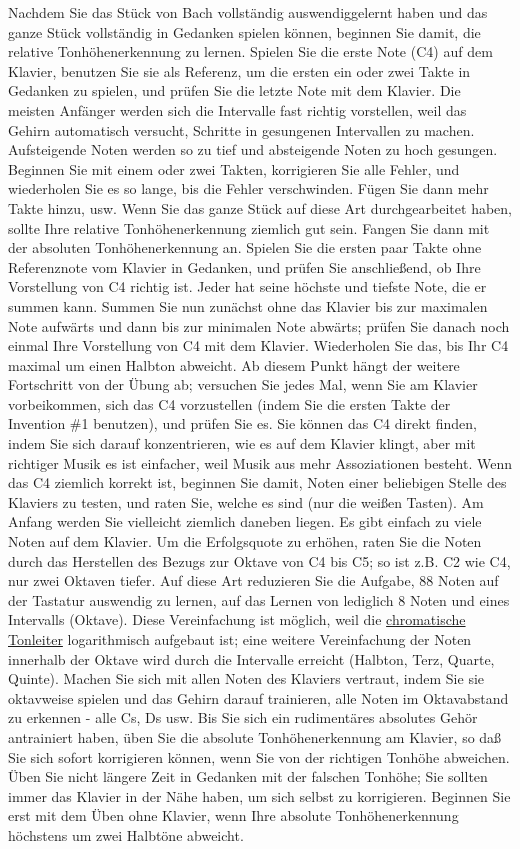 Nachdem Sie das Stück von Bach vollständig auswendiggelernt haben und das ganze Stück vollständig in Gedanken spielen können, beginnen Sie damit, die relative Tonhöhenerkennung zu lernen.
Spielen Sie die erste Note (C4) auf dem Klavier, benutzen Sie sie als Referenz, um die ersten ein oder zwei Takte in Gedanken zu spielen, und prüfen Sie die letzte Note mit dem Klavier.
Die meisten Anfänger werden sich die Intervalle fast richtig vorstellen, weil das Gehirn automatisch versucht, Schritte in gesungenen Intervallen zu machen.
Aufsteigende Noten werden so zu tief und absteigende Noten zu hoch gesungen.
Beginnen Sie mit einem oder zwei Takten, korrigieren Sie alle Fehler, und wiederholen Sie es so lange, bis die Fehler verschwinden.
Fügen Sie dann mehr Takte hinzu, usw.
Wenn Sie das ganze Stück auf diese Art durchgearbeitet haben, sollte Ihre relative Tonhöhenerkennung ziemlich gut sein.
Fangen Sie dann mit der absoluten Tonhöhenerkennung an.
Spielen Sie die ersten paar Takte ohne Referenznote vom Klavier in Gedanken, und prüfen Sie anschließend, ob Ihre Vorstellung von C4 richtig ist.
Jeder hat seine höchste und tiefste Note, die er summen kann.
Summen Sie nun zunächst ohne das Klavier bis zur maximalen Note aufwärts und dann bis zur minimalen Note abwärts; prüfen Sie danach noch einmal Ihre Vorstellung von C4 mit dem Klavier.
Wiederholen Sie das, bis Ihr C4 maximal um einen Halbton abweicht.
Ab diesem Punkt hängt der weitere Fortschritt von der Übung ab; versuchen Sie jedes Mal, wenn Sie am Klavier vorbeikommen, sich das C4 vorzustellen (indem Sie die ersten Takte der Invention \#1 benutzen), und prüfen Sie es.
Sie können das C4 direkt finden, indem Sie sich darauf konzentrieren, wie es auf dem Klavier klingt, aber mit richtiger Musik es ist einfacher, weil Musik aus mehr Assoziationen besteht.
Wenn das C4 ziemlich korrekt ist, beginnen Sie damit, Noten einer beliebigen Stelle des Klaviers zu testen, und raten Sie, welche es sind (nur die weißen Tasten).
Am Anfang werden Sie vielleicht ziemlich daneben liegen.
Es gibt einfach zu viele Noten auf dem Klavier.
Um die Erfolgsquote zu erhöhen, raten Sie die Noten durch das Herstellen des Bezugs zur Oktave von C4 bis C5; so ist z.B. C2 wie C4, nur zwei Oktaven tiefer.
Auf diese Art reduzieren Sie die Aufgabe, 88 Noten auf der Tastatur auswendig zu lernen, auf das Lernen von lediglich 8 Noten und eines Intervalls (Oktave).
Diese Vereinfachung ist möglich, weil die \hyperref[c2_2]{chromatische Tonleiter} logarithmisch aufgebaut ist; eine weitere Vereinfachung der Noten innerhalb der Oktave wird durch die Intervalle erreicht (Halbton, Terz, Quarte, Quinte).
Machen Sie sich mit allen Noten des Klaviers vertraut, indem Sie sie oktavweise spielen und das Gehirn darauf trainieren, alle Noten im Oktavabstand zu erkennen - alle Cs, Ds usw.
Bis Sie sich ein rudimentäres absolutes Gehör antrainiert haben, üben Sie die absolute Tonhöhenerkennung am Klavier, so daß Sie sich sofort korrigieren können, wenn Sie von der richtigen Tonhöhe abweichen.
Üben Sie nicht längere Zeit in Gedanken mit der falschen Tonhöhe; Sie sollten immer das Klavier in der Nähe haben, um sich selbst zu korrigieren.
Beginnen Sie erst mit dem Üben ohne Klavier, wenn Ihre absolute Tonhöhenerkennung höchstens um zwei Halbtöne abweicht.

